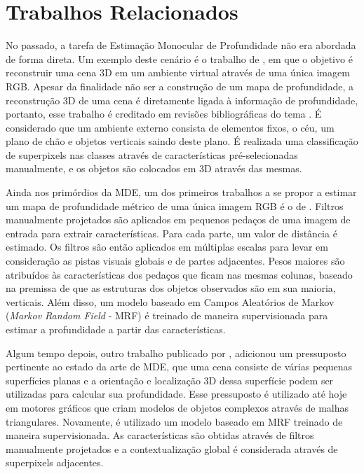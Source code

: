 \chapter{Trabalhos Relacionados}


No passado, a tarefa de Estimação Monocular de Profundidade não era abordada de forma direta. Um exemplo deste cenário é o trabalho de , em que o objetivo é reconstruir uma cena 3D em um ambiente virtual através de uma única imagem RGB. Apesar da finalidade não ser a construção de um mapa de profundidade, a reconstrução 3D de uma cena é diretamente ligada à informação de profundidade, portanto, esse trabalho é creditado em revisões bibliográficas do tema \cite{mertan2022single}. É considerado que um ambiente externo consista de elementos fixos, o céu, um plano de chão e objetos verticais saindo deste plano. É realizada uma classificação de superpixels nas classes através de características pré-selecionadas manualmente, e os objetos são colocados em 3D através das mesmas.


Ainda nos primórdios da MDE, um dos primeiros trabalhos a se propor a estimar um mapa de profundidade métrico de uma única imagem RGB é o de . Filtros manualmente projetados são aplicados em pequenos pedaços de uma imagem de entrada para extrair características. Para cada parte, um valor de distância é estimado. Os filtros são então aplicados em múltiplas escalas para levar em consideração as pistas visuais globais e de partes adjacentes. Pesos maiores são atribuídos às características dos pedaços que ficam nas mesmas colunas, baseado na premissa de que as estruturas dos objetos observados são em sua maioria, verticais. Além disso, um modelo baseado em Campos Aleatórios de Markov (\textit{Markov Random Field} - MRF) é treinado de maneira supervisionada para estimar a profundidade a partir das características.


Algum tempo depois, outro trabalho publicado por , adicionou um pressuposto pertinente ao estado da arte de MDE, que uma cena consiste de várias pequenas superfícies planas e a orientação e localização 3D dessa superfície podem ser utilizadas para calcular sua profundidade. Esse pressuposto é utilizado até hoje em motores gráficos que criam modelos de objetos complexos através de malhas triangulares. Novamente, é utilizado um modelo baseado em MRF treinado de maneira supervisionada. As características são obtidas através de filtros manualmente projetados e a contextualização global é considerada através de superpixels adjacentes.



